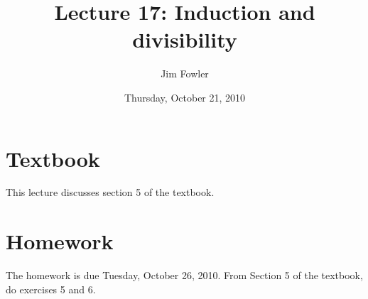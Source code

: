 \documentclass[12pt]{handout}
\title{Lecture 17: Induction and divisibility}
\author{Jim Fowler}
\date{Thursday, October 21, 2010}
\begin{document}
\maketitle

\section*{Textbook}

This lecture discusses section 5 of the textbook.

\section*{Homework} 

The homework is due Tuesday, October 26, 2010.
From Section 5 of the textbook, do exercises 5 and 6.
\end{document}

